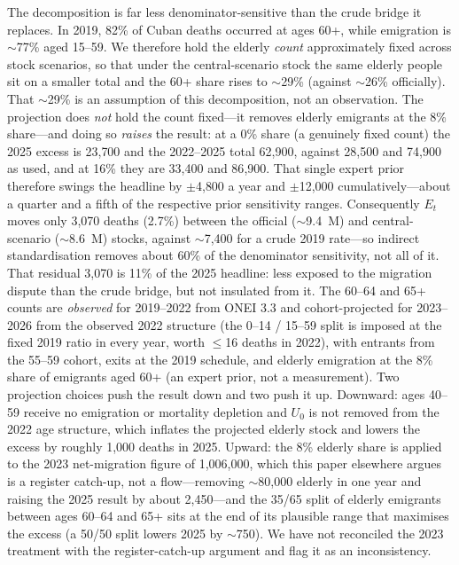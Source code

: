 \documentclass[11pt,a4paper]{article}
\begin{document}
The decomposition is far less denominator-sensitive than the crude bridge it replaces.
In 2019, 82\% of Cuban deaths occurred at ages 60+, while emigration is $\sim$77\% aged 15--59.
We therefore hold the elderly \emph{count} approximately fixed across stock scenarios, so that under the central-scenario stock the same elderly people sit on a smaller total and the 60+ share rises to $\sim$29\% (against $\sim$26\% officially).
That $\sim$29\% is an assumption of this decomposition, not an observation. The projection does \emph{not} hold the count fixed---it removes elderly emigrants at the 8\% share---and doing so \emph{raises} the result: at a 0\% share (a genuinely fixed count) the 2025 excess is 23{,}700 and the 2022--2025 total 62{,}900, against 28{,}500 and 74{,}900 as used, and at 16\% they are 33{,}400 and 86{,}900. That single expert prior therefore swings the headline by $\pm$4{,}800 a year and $\pm$12{,}000 cumulatively---about a quarter and a fifth of the respective prior sensitivity ranges.
Consequently $E_t$ moves only 3{,}070 deaths (2.7\%) between the official ($\sim$9.4~M) and central-scenario ($\sim$8.6~M) stocks, against $\sim$7{,}400 for a crude 2019 rate---so indirect standardisation removes about 60\% of the denominator sensitivity, not all of it. That residual 3{,}070 is 11\% of the 2025 headline: less exposed to the migration dispute than the crude bridge, but not insulated from it.
The 60--64 and 65+ counts are \emph{observed} for 2019--2022 from ONEI 3.3 and cohort-projected for 2023--2026 from the observed 2022 structure (the 0--14 / 15--59 split is imposed at the fixed 2019 ratio in every year, worth $\le$16 deaths in 2022), with entrants from the 55--59 cohort, exits at the 2019 schedule, and elderly emigration at the 8\% share of emigrants aged 60+ (an expert prior, not a measurement). Two projection choices push the result down and two push it up. Downward: ages 40--59 receive no emigration or mortality depletion and $U_0$ is not removed from the 2022 age structure, which inflates the projected elderly stock and lowers the excess by roughly 1{,}000 deaths in 2025. Upward: the 8\% elderly share is applied to the 2023 net-migration figure of 1{,}006{,}000, which this paper elsewhere argues is a register catch-up, not a flow---removing $\sim$80{,}000 elderly in one year and raising the 2025 result by about 2{,}450---and the 35/65 split of elderly emigrants between ages 60--64 and 65+ sits at the end of its plausible range that maximises the excess (a 50/50 split lowers 2025 by $\sim$750). We have not reconciled the 2023 treatment with the register-catch-up argument and flag it as an inconsistency.
\end{document}
